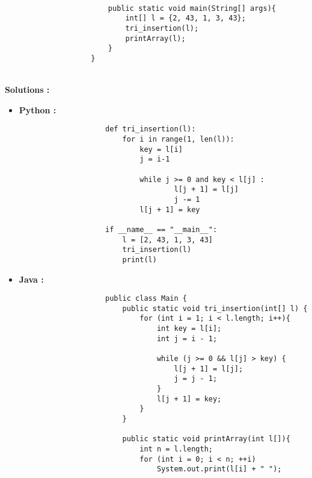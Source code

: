 \begin{Exercice} [10 minutes]
\begin{itemize}
\begin{verbatim}
                        
                        public static void main(String[] args){
                            int[] l = {2, 43, 1, 3, 43};
                            tri_insertion(l);
                            printArray(l);
                        }
                    }
                \end{verbatim}
    \end{itemize}
    
    \begin{conseil}

    \end{conseil}
    \ \\
    
    \textbf{Solutions :}
    \begin{itemize}
        \item \textbf{Python :}
                \begin{verbatim}
                    def tri_insertion(l):
                        for i in range(1, len(l)):
                            key = l[i] 
                            j = i-1
                            
                            while j >= 0 and key < l[j] : 
                                    l[j + 1] = l[j] 
                                    j -= 1
                            l[j + 1] = key 
                    
                    if __name__ == "__main__":
                        l = [2, 43, 1, 3, 43]
                        tri_insertion(l)
                        print(l)
                \end{verbatim}
        \item \textbf{Java :}
                \begin{verbatim}
                    public class Main {
                        public static void tri_insertion(int[] l) {
                            for (int i = 1; i < l.length; i++){
                                int key = l[i]; 
                                int j = i - 1; 
                      
                                while (j >= 0 && l[j] > key) { 
                                    l[j + 1] = l[j]; 
                                    j = j - 1; 
                                } 
                                l[j + 1] = key; 
                            }
                        }
                        
                        public static void printArray(int l[]){ 
                            int n = l.length; 
                            for (int i = 0; i < n; ++i) 
                                System.out.print(l[i] + " "); 
                      

\end{verbatim}
\end{itemize}
\end{Exercice}
